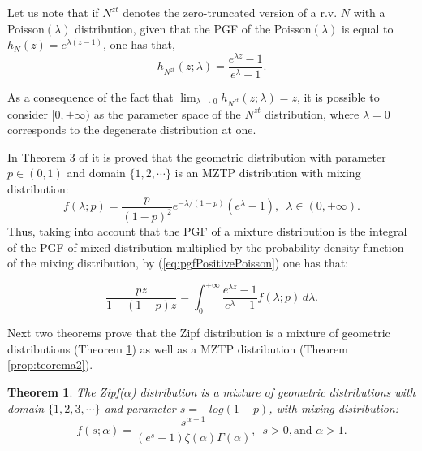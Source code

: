 \documentclass{article}
\newtheorem{theorem}{Theorem}%
\begin{document}
\noindent Let us  note that if $N^{zt}$ denotes the zero-truncated version of a r.v. $N$ with a Poisson$(\lambda)$ distribution, given that the PGF of the Poisson$(\lambda)$ is equal to $h_N(z)=e^{\lambda (z-1)}$, one has that,  
\begin{equation} \label{eq:pgfPositivePoisson}
h_{N^{zt}} (z;\lambda)= \frac{e^{\lambda z}-1}{e^{\lambda}-1}.
\end{equation} 

As a consequence of the fact that $\lim_{\lambda \to 0} h_{N^{zt}} (z;\lambda)=z$, it is possible to consider $[0,+\infty)$ as the parameter space of the $N^{zt}$ distribution, where $\lambda=0$ corresponds to the degenerate distribution at one. 

\noindent In Theorem 3 of \cite{valero2022zipf} it is proved that the geometric distribution with parameter $p\in(0,1)$ and domain $\{1,2,\cdots\}$ is an MZTP distribution with mixing distribution:
\begin{equation}\label{eq:mixinggeo}
	f(\lambda;p)=\frac{p}{(1-p)^2} e^{-\lambda/(1-p)} (e^{\lambda}-1),\,\,\, \lambda\in (0,+\infty).
\end{equation}
Thus, taking into account that the PGF of a mixture distribution is the integral of the PGF of mixed distribution multiplied by the probability density function of the mixing distribution, by (\ref{eq:pgfPositivePoisson}) one has that:

\begin{equation} \label{eq:pgfgeom-mixtura}
\frac{ p z}{1-(1-p) z}=\int_0^{+\infty} \frac{e^{\lambda z}-1}{e^{\lambda}-1} f(\lambda; p)\, d \lambda.    
\end{equation}

Next two theorems prove that the Zipf distribution is a mixture of geometric distributions (Theorem \ref{prop:teo-geozipf}) as well as a MZTP distribution (Theorem \ref{prop:teorema2}).

\begin{theorem}
\label{prop:teo-geozipf}
The Zipf($\alpha$) distribution is a mixture of  geometric distributions with domain $\{1,2,3,\cdots\}$ and parameter $s = -log(1-p)$, with mixing distribution:
\begin{equation} \label{eq:mixinggeozipf}
f(s;\alpha)=\frac{s^{\alpha-1}}{(e^{s}-1) \zeta(\alpha) \Gamma(\alpha)},\,\,\,  s>0, \textrm{and}\,\, \alpha>1.
\end{equation}    
\end{theorem}
\end{document}
